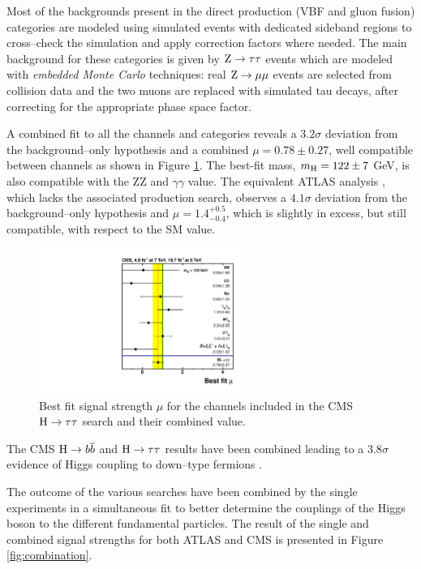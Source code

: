 Most of the backgrounds present in the direct production (VBF and gluon fusion) categories are modeled using simulated events with dedicated sideband regions to cross--check the simulation and apply correction factors where needed. The main background for these categories is given by $\mathrm{Z} \rightarrow \tau\tau$ events which are modeled with \emph{embedded Monte Carlo} techniques: real $\mathrm{Z} \rightarrow \mu \mu$ events are selected from collision data and the two muons are replaced with simulated tau decays, after correcting for the appropriate phase space factor.

A combined fit to all the channels and categories reveals a $3.2\sigma$ deviation from the background--only hypothesis and a combined $\mu = 0.78 \pm 0.27$, well compatible between channels as shown in Figure \ref{fig:htt_mu}. The best-fit mass, $m_{\mathrm{H}} = 122 \pm 7$ GeV, is also compatible with the ZZ and $\gamma\gamma$ value. The equivalent ATLAS analysis \cite{ATLASCONF:2013108}, which lacks the associated production search, observes a $4.1\sigma$ deviation from the background--only hypothesis and $\mu = 1.4^{+0.5}_{-0.4}$, which is slightly in excess, but still compatible, with respect to the SM value.

\begin{figure}
        \centering
	\includegraphics[width=0.6\textwidth]{1_Introduction_Th_and_Exp/pics/BestFit_sm_per_chn.pdf}
       \caption{Best fit signal strength $\mu$ for the channels included in the CMS $\mathrm{H} \rightarrow \tau \tau$ search and their combined value.}
       \label{fig:htt_mu}
\end{figure}

The CMS $\mathrm{H} \rightarrow b\overline{b}$ and $\mathrm{H} \rightarrow \tau \tau$ results have been combined leading to a $3.8\sigma$ evidence of Higgs coupling to down--type fermions \cite{Chatrchyan:2014vua}.

The outcome of the various searches have been combined by the single experiments in a simultaneous fit to better determine the couplings of the Higgs boson to the different fundamental particles. The result of the single and combined signal strengths for both ATLAS \cite{ATLASCONF:2014009} and CMS \cite{CMS:2014ega} is presented in Figure \ref{fig:combination}.

